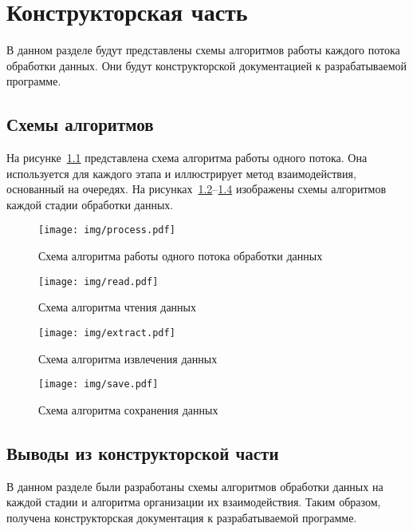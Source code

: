 \chapter{Конструкторская часть}

В данном разделе будут представлены схемы алгоритмов работы каждого потока обработки данных.
Они будут конструкторской документацией к разрабатываемой программе.

\section{Схемы алгоритмов}
На рисунке~\ref{fig:process} представлена схема
алгоритма работы одного потока.
Она используется для каждого этапа и иллюстрирует метод взаимодействия, основанный на очередях.
На рисунках~\ref{fig:read}--\ref{fig:save} изображены схемы алгоритмов каждой стадии обработки данных.

\begin{figure}[H]
	\centering
	\texttt{[image: img/process.pdf]}
	\caption{
        Схема алгоритма работы одного потока обработки данных
    }
	\label{fig:process}
\end{figure}

\begin{figure}[H]
	\centering
	\texttt{[image: img/read.pdf]}
	\caption{
        Схема алгоритма чтения данных
    }
	\label{fig:read}
\end{figure}

\begin{figure}[H]
	\centering
	\texttt{[image: img/extract.pdf]}
	\caption{
        Схема алгоритма извлечения данных
    }
	\label{fig:extract}
\end{figure}

\begin{figure}[H]
	\centering
	\texttt{[image: img/save.pdf]}
	\caption{
        Схема алгоритма сохранения данных
    }
	\label{fig:save}
\end{figure}

\section*{Выводы из конструкторской части}
В данном разделе были разработаны схемы алгоритмов обработки данных на каждой стадии и алгоритма организации их взаимодействия.
Таким образом, получена конструкторская документация к разрабатываемой программе.